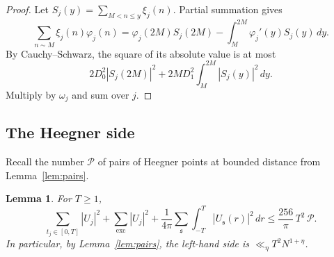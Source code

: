 \documentclass[11pt]{amsart}
\newtheorem{lemma}[theorem]{Lemma}
\theoremstyle{remark}
\theoremstyle{definition}
\numberwithin{equation}{section}
\newcommand{\Pc}{\mathcal{P}}
\newcommand{\gs}{\mathfrak{s}}
\newcommand{\exc}{\mathrm{exc}}
\begin{document}
\begin{proof}
Let $S_j(y)=\sum_{M<n\le y}\xi_j(n)$. Partial summation gives
\[
\sum_{n\sim M}\xi_j(n)\varphi_j(n)=\varphi_j(2M)S_j(2M)-\int_M^{2M}\varphi_j'(y)S_j(y)\,dy.
\]
By Cauchy--Schwarz, the square of its absolute value is at most
\[
2D_0^2|S_j(2M)|^2+2MD_1^2\int_M^{2M}|S_j(y)|^2\,dy.
\]
Multiply by $\omega_j$ and sum over $j$.
\end{proof}

\subsection{The Heegner side}
Recall the number $\Pc$ of pairs of Heegner points at bounded distance from Lemma~\ref{lem:pairs}.

\begin{lemma}\label{lem:heegner}
For $T\ge1$,
\[
\sum_{t_j\in[0,T]}|U_j|^2+\sum_{\exc}|U_j|^2+\frac1{4\pi}\sum_\gs\int_{-T}^T|U_\gs(r)|^2\,dr\le\frac{256}{\pi}\,T^2\,\Pc .
\]
In particular, by Lemma~\ref{lem:pairs}, the left-hand side is $\ll_\eta T^2N^{1+\eta}$.
\end{lemma}
\end{document}
